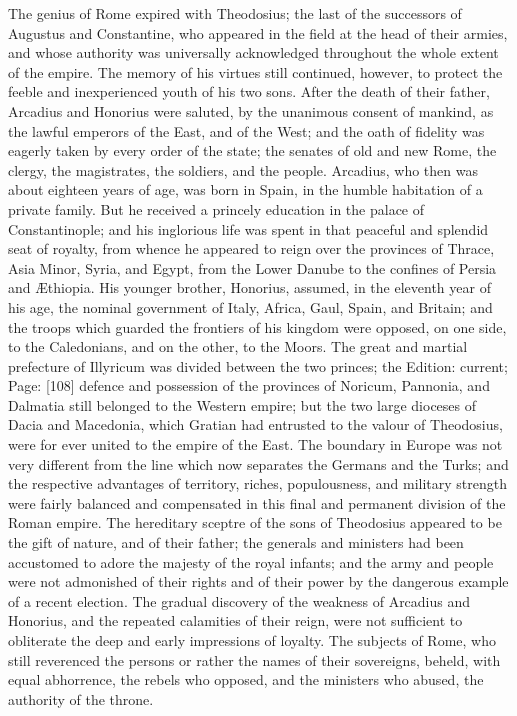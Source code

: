 The genius of Rome expired with Theodosius; the last of the successors of Augustus and Constantine, who appeared in the field at the head of their armies, and whose authority was universally acknowledged throughout the whole extent of the empire. The memory of his virtues still continued, however, to protect the feeble and inexperienced youth of his two sons. After the death of their father, Arcadius and Honorius were saluted, by the unanimous consent of mankind, as the lawful emperors of the East, and of the West; and the oath of fidelity was eagerly taken by every order of the state; the senates of old and new Rome, the clergy, the magistrates, the soldiers, and the people. Arcadius, who then was about eighteen years of age, was born in Spain, in the humble habitation of a private family. But he received a princely education in the palace of Constantinople; and his inglorious life was spent in that peaceful and splendid seat of royalty, from whence he appeared to reign over the provinces of Thrace, Asia Minor, Syria, and Egypt, from the Lower Danube to the confines of Persia and Æthiopia. His younger brother, Honorius, assumed, in the eleventh year of his age, the nominal government of Italy, Africa, Gaul, Spain, and Britain; and the troops which guarded the frontiers of his kingdom were opposed, on one side, to the Caledonians, and on the other, to the Moors. The great and martial prefecture of Illyricum was divided between the two princes; the Edition: current; Page: [108] defence and possession of the provinces of Noricum, Pannonia, and Dalmatia still belonged to the Western empire; but the two large dioceses of Dacia and Macedonia, which Gratian had entrusted to the valour of Theodosius, were for ever united to the empire of the East. The boundary in Europe was not very different from the line which now separates the Germans and the Turks; and the respective advantages of territory, riches, populousness, and military strength were fairly balanced and compensated in this final and permanent division of the Roman empire. The hereditary sceptre of the sons of Theodosius appeared to be the gift of nature, and of their father; the generals and ministers had been accustomed to adore the majesty of the royal infants; and the army and people were not admonished of their rights and of their power by the dangerous example of a recent election. The gradual discovery of the weakness of Arcadius and Honorius, and the repeated calamities of their reign, were not sufficient to obliterate the deep and early impressions of loyalty. The subjects of Rome, who still reverenced the persons or rather the names of their sovereigns, beheld, with equal abhorrence, the rebels who opposed, and the ministers who abused, the authority of the throne.

